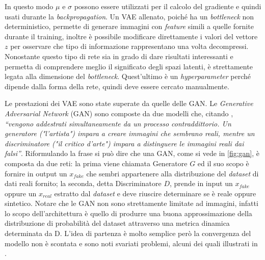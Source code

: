 In questo modo $\mu$ e $\sigma$ possono essere utilizzati per il calcolo del gradiente e quindi usati durante la \emph{backpropagation}.
Un VAE allenato, poiché ha un \emph{bottleneck} non deterministico, permette di generare immagini con \emph{feature} simili a quelle fornite durante il training, inoltre è possibile modificare direttamente i valori del vettore $z$ per osservare che tipo di informazione rappresentano una volta decompressi.
Nonostante questo tipo di rete sia in grado di dare risultati interessanti e permetta di comprendere meglio il significato degli spazi latenti, è strettamente legata alla dimensione del \emph{bottleneck}.
Quest'ultimo è un \emph{hyperparameter} perché dipende dalla forma della rete, quindi deve essere cercato manualmente.



Le prestazioni dei VAE sono state superate da quelle delle GAN.
Le \emph{Generative Adversarial Network} (GAN) sono composte da due modelli che, citando \cite{GANTF}, \emph{``vengono addestrati simultaneamente da un processo contraddittorio. Un generatore ("l'artista") impara a creare immagini che sembrano reali, mentre un discriminatore ("il critico d'arte") impara a distinguere le immagini reali dai falsi''}.
Riformulando la frase si può dire che una GAN, come si vede in \autoref{fig:gan}, è composta da due reti: la prima viene chiamata Generatore $G$ ed il suo scopo è fornire in output un $x_{fake}$ che sembri appartenere alla distribuzione del \emph{dataset} di dati reali fornito; la seconda, detta Discriminatore $D$, prende in input un $x_{fake}$ oppure un $x_{real}$ estratto dal \emph{dataset} e deve riuscire determinare se è reale oppure sintetico.
Notare che le GAN non sono strettamente limitate ad immagini, infatti lo scopo dell'architettura è quello di produrre una buona approssimazione della distribuzione di probabilità del dataset attraverso una metrica dinamica determinata da D.
L'idea di partenza è molto semplice però la convergenza del modello non è scontata e sono noti svariati problemi, alcuni dei quali illustrati in \cite{HARD_GAN}.

